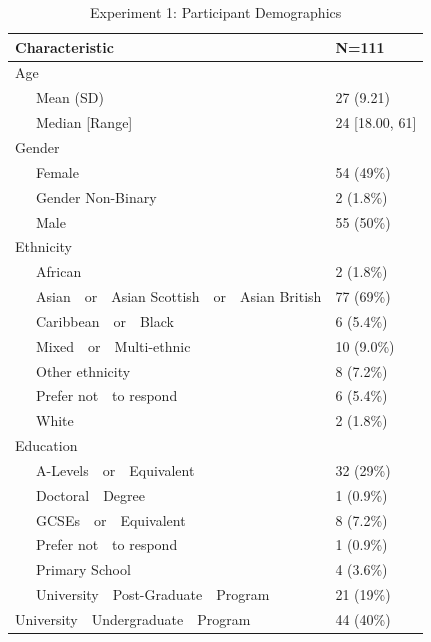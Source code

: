 \documentclass[
  donotrepeattitle,doc, 12pt, a4paper,floatsintext]{apa7}
\begin{document}
\begin{table}[ht]

\begin{center}
\begin{threeparttable}

\caption{\label{tab:demographicTableExperiment1}Experiment 1: Participant Demographics}

\begin{tabular}{ll}
\toprule
Characteristic & N=111\\
\midrule
Age & \\
\ \ \ Mean (SD) & 27 (9.21)\\
\ \ \ Median [Range] & 24 [18.00, 61]\\
Gender & \\
\ \ \ Female & 54 (49\%)\\
\ \ \ Gender Non-Binary & 2 (1.8\%)\\
\ \ \ Male & 55 (50\%)\\
Ethnicity & \\
\ \ \ African & 2 (1.8\%)\\
\ \ \ Asian\ \ or\ \ Asian Scottish\ \ or\ \ Asian British & 77 (69\%)\\
\ \ \ Caribbean\ \ or\ \ Black & 6 (5.4\%)\\
\ \ \ Mixed\ \ or\ \ Multi-ethnic & 10 (9.0\%)\\
\ \ \ Other ethnicity & 8 (7.2\%)\\
\ \ \ Prefer not\ \ to respond & 6 (5.4\%)\\
\ \ \ White & 2 (1.8\%)\\
Education & \\
\ \ \ A-Levels\ \ or\ \ Equivalent & 32 (29\%)\\
\ \ \ Doctoral\ \ Degree & 1 (0.9\%)\\
\ \ \ GCSEs\ \ or\ \ Equivalent & 8 (7.2\%)\\
\ \ \ Prefer not\ \ to respond & 1 (0.9\%)\\
\ \ \ Primary School & 4 (3.6\%)\\
\ \ \ University\ \ Post-Graduate\ \ Program & 21 (19\%)\\
University\ \ Undergraduate\ \ Program & 44 (40\%)\\
\bottomrule
\end{tabular}

\end{threeparttable}
\end{center}

\end{table}
\end{document}
